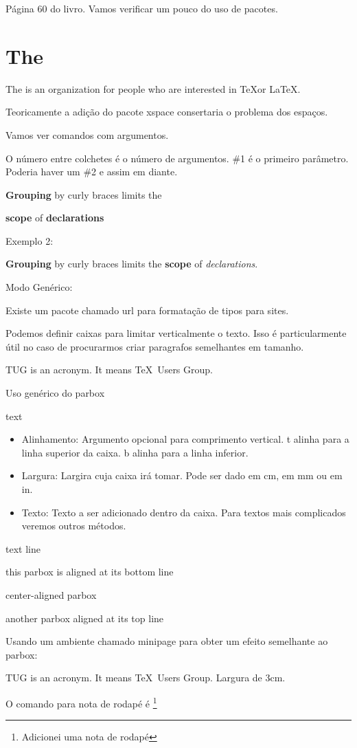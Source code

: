 \documentclass{article}
\begin{document}
Página 60 do livro.
Vamos verificar um pouco do uso de pacotes.

\usepackage{xspace}
\section{The \TUG}

The \TUG is an organization for people
who are interested in \TeX or \LaTeX.

Teoricamente a adição do pacote xspace consertaria o problema dos espaços.

Vamos ver comandos com argumentos.

\newcommand{\keyword}[1]{\textbf{#1}}

O número entre colchetes é o número de argumentos.
\#1 é o primeiro parâmetro. Poderia haver um \#2 e assim
em diante.


\keyword{Grouping} by curly braces limits the

\keyword{scope} of \keyword{declarations}

Exemplo 2:

\renewcommand{\keyword}[2][\bfseries]{{#1#2}}
\keyword{Grouping} by curly braces limits the
\keyword{scope} of \keyword[\itshape]{declarations}.

Modo Genérico:

Existe um pacote chamado url para formatação de tipos para sites.

Podemos definir caixas para limitar verticalmente o texto.
Isso é particularmente útil no caso de procurarmos criar paragrafos semelhantes em tamanho.

\parbox{3cm}{TUG is an acronym. It means \TeX\ Users Group.}

Uso genérico do parbox \parbox[alignment]{width}{text}
\begin{itemize}
        \item Alinhamento: Argumento opcional para comprimento vertical.
        t alinha para a linha superior da caixa.
        b alinha para a linha inferior.
        \item Largura: Largira cuja caixa irá tomar. Pode ser dado em cm, em mm ou em in.
        \item Texto: Texto a ser adicionado dentro da caixa.
        Para textos mais complicados veremos outros métodos.
\end{itemize}

text line
\quad\parbox[b]{1.8cm}{this parbox is aligned at its bottom line}
\quad\parbox{1.5cm}{center-aligned parbox}
\quad\parbox[t]{2cm}{another parbox aligned at its top line}


Usando um ambiente chamado minipage para obter um efeito semelhante ao parbox:

\begin{minipage}{3cm}

    TUG is an acronym. It means \TeX\ Users Group. Largura de 3cm.

\end{minipage}

O comando para nota de rodapé é \footnote{Adicionei uma nota de rodapé}
\end{document}
